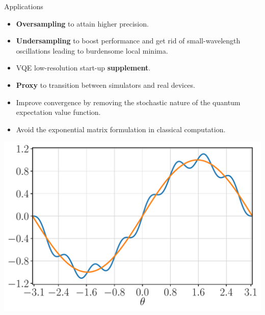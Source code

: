 \documentclass[9pt, handout, aspectratio=169]{beamer}	%
\begin{document}
\begin{frame}{Applications}

	\begin{multicols}{2}
		\begin{itemize}
			\item \textbf{Oversampling} to attain higher precision.
			\item \textbf{Undersampling} to boost performance and get rid of small-wavelength oscillations leading to burdensome local minima.
			\item VQE low-resolution start-up \textbf{supplement}.
			\item \textbf{Proxy} to transition between simulators and real devices.
			\item Improve convergence by removing the stochastic nature of the quantum expectation value function.
			\item Avoid the exponential matrix formulation in classical computation.
		\end{itemize}

		\columnbreak

		\begin{center}
			\includegraphics[width=.40\paperwidth]{Figures/low-resolution}
		\end{center}

	\end{multicols}

\end{frame}

\end{document}
